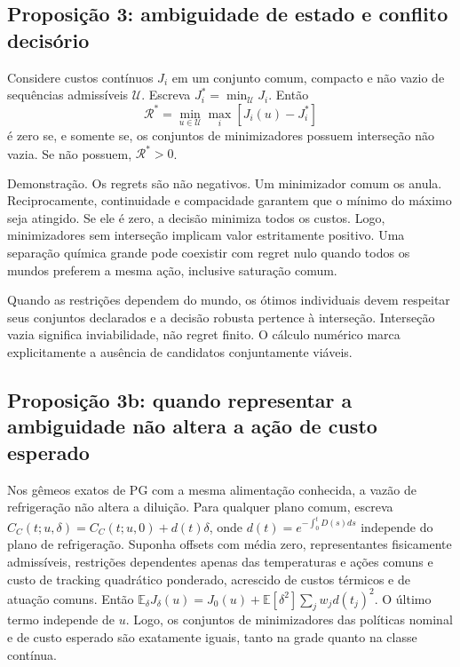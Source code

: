 \documentclass[
  11pt,
]{article}
\begin{document}
\hypertarget{proposiuxe7uxe3o-3-ambiguidade-de-estado-e-conflito-decisuxf3rio}{%
\subsection{Proposição 3: ambiguidade de estado e conflito
decisório}\label{proposiuxe7uxe3o-3-ambiguidade-de-estado-e-conflito-decisuxf3rio}}

Considere custos contínuos \(J_i\) em um conjunto comum, compacto e não
vazio de sequências admissíveis \(\mathcal U\). Escreva
\(J_i^*=\min_{\mathcal U}J_i\). Então
\[\mathcal R^*=\min_{u\in\mathcal U}\max_i[J_i(u)-J_i^*]\] é zero se, e
somente se, os conjuntos de minimizadores possuem interseção não vazia.
Se não possuem, \(\mathcal R^*>0\).

Demonstração. Os regrets são não negativos. Um minimizador comum os
anula. Reciprocamente, continuidade e compacidade garantem que o mínimo
do máximo seja atingido. Se ele é zero, a decisão minimiza todos os
custos. Logo, minimizadores sem interseção implicam valor estritamente
positivo. Uma separação química grande pode coexistir com regret nulo
quando todos os mundos preferem a mesma ação, inclusive saturação comum.

Quando as restrições dependem do mundo, os ótimos individuais devem
respeitar seus conjuntos declarados e a decisão robusta pertence à
interseção. Interseção vazia significa inviabilidade, não regret finito.
O cálculo numérico marca explicitamente a ausência de candidatos
conjuntamente viáveis.

\hypertarget{proposiuxe7uxe3o-3b-quando-representar-a-ambiguidade-nuxe3o-altera-a-auxe7uxe3o-de-custo-esperado}{%
\subsection{Proposição 3b: quando representar a ambiguidade não altera a
ação de custo
esperado}\label{proposiuxe7uxe3o-3b-quando-representar-a-ambiguidade-nuxe3o-altera-a-auxe7uxe3o-de-custo-esperado}}

Nos gêmeos exatos de PG com a mesma alimentação conhecida, a vazão de
refrigeração não altera a diluição. Para qualquer plano comum, escreva
\(C_C(t;u,\delta)=C_C(t;u,0)+d(t)\delta\), onde
\(d(t)=e^{-\int_0^tD(s)ds}\) independe do plano de refrigeração. Suponha
offsets com média zero, representantes fisicamente admissíveis,
restrições dependentes apenas das temperaturas e ações comuns e custo de
tracking quadrático ponderado, acrescido de custos térmicos e de atuação
comuns. Então
\(\mathbb E_\delta J_\delta(u)=J_0(u)+\mathbb E[\delta^2]\sum_j w_jd(t_j)^2.\)
O último termo independe de \(u\). Logo, os conjuntos de minimizadores
das políticas nominal e de custo esperado são exatamente iguais, tanto
na grade quanto na classe contínua.
\end{document}

